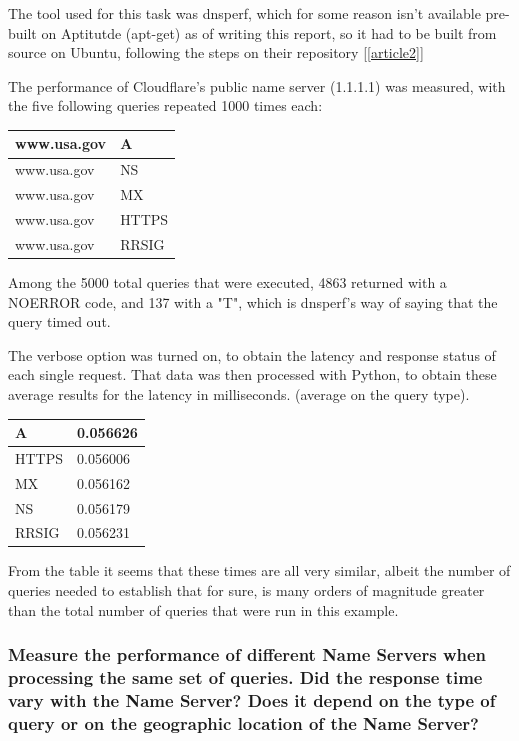 \documentclass[a4paper,10pt]{article}
\begin{document}
The tool used for this task was dnsperf, which for some reason isn't available pre-built on Aptitutde (apt-get) as of writing this report, so it had to be built from source on Ubuntu, following the steps on their repository [\ref{article2}]

The performance of Cloudflare's public name server (1.1.1.1) was measured, with the five following queries repeated 1000 times each:

\begin{table}[h!]
\centering
\begin{tabular}{|l|l|}
\hline
www.usa.gov & A     \\ \hline
www.usa.gov & NS    \\ \hline
www.usa.gov & MX    \\ \hline
www.usa.gov & HTTPS \\ \hline
www.usa.gov & RRSIG \\ \hline
\end{tabular}
\end{table}

Among the 5000 total queries that were executed,  4863 returned with a NOERROR code, and 137 with a "T", which is dnsperf's way of saying that the query timed out.

The verbose option was turned on, to obtain the latency and response status of each single request. That data was then processed with Python, to obtain these average results for the latency in milliseconds. (average on the query type).

\begin{table}[h!]
\centering
\begin{tabular}{|l|l|}
\hline
A     & 0.056626 \\ \hline
HTTPS & 0.056006 \\ \hline
MX    & 0.056162 \\ \hline
NS    & 0.056179 \\ \hline
RRSIG & 0.056231 \\ \hline
\end{tabular}
\end{table}


From the table it seems that these times are all very similar, albeit the number of queries needed to establish that for sure, is many orders of magnitude greater than the total number of queries that were run in this example.


\subsubsection{Measure the performance of different Name Servers when processing the same
set of queries. Did the response time vary with the Name Server? Does it depend
on the type of query or on the geographic location of the Name Server?}
\end{document}
